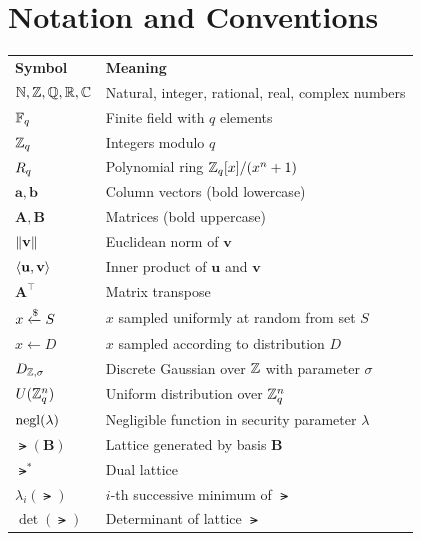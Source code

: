 \chapter*{Notation and Conventions}

\begin{tabular}{lp{9.5cm}}
\hline\noalign{\smallskip}
\textbf{Symbol} & \textbf{Meaning} \\
\noalign{\smallskip}\svhline\noalign{\smallskip}

$\mathbb{N}, \mathbb{Z}, \mathbb{Q}, \mathbb{R}, \mathbb{C}$ & Natural, integer, rational, real, complex numbers \\
$\mathbb{F}_q$ & Finite field with $q$ elements \\
$\mathbb{Z}_q$ & Integers modulo $q$ \\
$R_q$ & Polynomial ring $\mathbb{Z}_q[x]/(x^n + 1)$ \\

\noalign{\smallskip}\svhline\noalign{\smallskip}
$\mathbf{a}, \mathbf{b}$ & Column vectors (bold lowercase) \\
$\mathbf{A}, \mathbf{B}$ & Matrices (bold uppercase) \\
$\left\lVert \mathbf{v} \right\rVert$ & Euclidean norm of $\mathbf{v}$ \\
$\left\langle \mathbf{u}, \mathbf{v} \right\rangle$ & Inner product of $\mathbf{u}$ and $\mathbf{v}$ \\
$\mathbf{A}^\top$ & Matrix transpose \\

\noalign{\smallskip}\svhline\noalign{\smallskip}
$x \getsr S$ & $x$ sampled uniformly at random from set $S$ \\
$x \leftarrow D$ & $x$ sampled according to distribution $D$ \\
$D_{\mathbb{Z},\sigma}$ & Discrete Gaussian over $\mathbb{Z}$ with parameter $\sigma$ \\
$U(\mathbb{Z}_q^n)$ & Uniform distribution over $\mathbb{Z}_q^n$ \\
$\operatorname{negl}(\lambda)$ & Negligible function in security parameter $\lambda$ \\

\noalign{\smallskip}\svhline\noalign{\smallskip}
$\lat(\mathbf{B})$ & Lattice generated by basis $\mathbf{B}$ \\
$\lat^*$ & Dual lattice \\
$\lambda_i(\lat)$ & $i$-th successive minimum of $\lat$ \\
$\det(\lat)$ & Determinant of lattice $\lat$ \\


\end{tabular}
